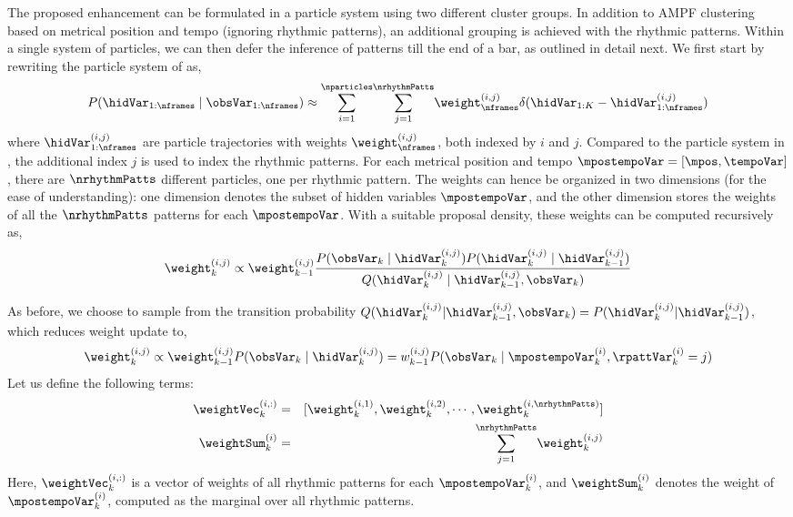 The proposed enhancement can be formulated in a particle system using two different cluster groups. In addition to \gls{AMPF} clustering based on metrical position and tempo (ignoring rhythmic patterns), an additional grouping is achieved with the rhythmic patterns. %
Within a single system of particles, we can then defer the inference of patterns till the end of a bar, as outlined in detail next. We first start by rewriting the particle system of  as, 
\begin{equation}\label{eqn:pfacc:pfposterior}
P(\hidVar_{1:\nframes} \mid \obsVar_{1:\nframes})\approx\overset{\nparticles}{\underset{i=1}{\sum}}\overset{\nrhythmPatts}{\underset{j=1}{\sum}}\weight_{\nframes}^{(i,j)}\delta(\hidVar_{1:K}-\hidVar_{1:\nframes}^{(i,j)})	
\end{equation}
where $\hidVar_{1:\nframes}^{(i,j)}$ are particle trajectories with weights $\weight_{\nframes}^{(i,j)}$, both indexed by $i$ and $j$. Compared to the particle system in , the additional index $j$ is used to index the rhythmic patterns. For each metrical position and tempo $\mpostempoVar = [\mpos,\tempoVar]$, there are $\nrhythmPatts$ different particles, one per rhythmic pattern. The weights can hence be organized in two dimensions (for the ease of understanding): one dimension denotes the subset of hidden variables $\mpostempoVar$, and the other dimension stores the weights of all the $\nrhythmPatts$ patterns for each $\mpostempoVar$. 
%
With a suitable proposal density, these weights can be computed recursively as, 
\begin{equation}\label{eqn:pfacc:wtproposal}
\weight_{k}^{(i,j)}\propto \weight_{k-1}^{(i,j)}\frac{P(\obsVar_{k} \mid \hidVar_{k}^{(i,j)})P(\hidVar_{k}^{(i,j)} \mid \hidVar_{k-1}^{(i,j)})}{Q(\hidVar_{k}^{(i,j)} \mid \hidVar_{k-1}^{(i,j)},\obsVar_{k})}
\end{equation}

As before, we choose to sample from the transition probability $Q(\hidVar_{k}^{(i,j)} | \hidVar_{k-1}^{(i,j)},\obsVar_{k}) = P(\hidVar_{k}^{(i,j)} | \hidVar_{k-1}^{(i,j)})$, which reduces weight update to,
%
\begin{equation}\label{eqn:pfacc:wtupdate}
\weight_{k}^{(i,j)}\propto \weight_{k-1}^{(i,j)}P(\obsVar_{k} \mid \hidVar_{k}^{(i,j)}) = w_{k-1}^{(i,j)}P(\obsVar_{k} \mid \mpostempoVar_{k}^{(i)},\rpattVar^{(i)}_k=j)
\end{equation}
Let us define the following terms: 
\begin{eqnarray}
 \weightVec_{k}^{(i,:)} &=& [\weight_{k}^{(i,1)}, \weight_{k}^{(i,2)}, \cdots, \weight_{k}^{(i,\nrhythmPatts)}] \\
 \weightSum_{k}^{(i)} &=& \overset{\nrhythmPatts}{\underset{j=1}{\sum}}\weight_{k}^{(i,j)}
\end{eqnarray}
%
Here, $\weightVec_{k}^{(i,:)}$ is a vector of weights of all rhythmic patterns for each $\mpostempoVar_{k}^{(i)}$, and $\weightSum_{k}^{(i)}$ denotes the weight of $\mpostempoVar_{k}^{(i)}$, computed as the marginal over all rhythmic patterns. 


